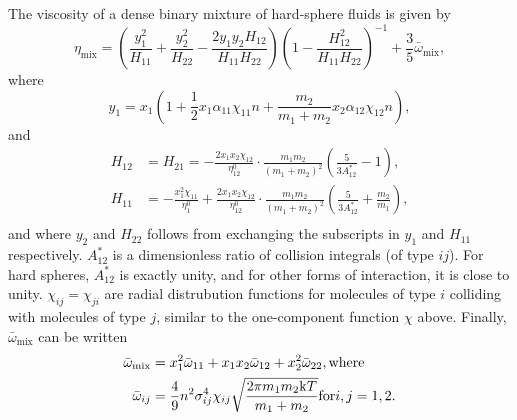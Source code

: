 The viscosity of a dense binary mixture of hard-sphere fluids is given by
\begin{equation}
    \eta_{\text{mix}} 
        = \left(
            \frac{y_1^2}{H_{11}} + \frac{y_2^2}{H_{22}} - \frac{2 y_1 y_2 H_{12}}{H_{11} H_{22}}
        \right)
        \left(
            1 - \frac{H_{12}^2}{H_{11} H_{22}}
        \right)^{-1}
        + \frac{3}{5} \bar{\omega}_{\text{mix}},
\end{equation}
where
\begin{equation}
    \label{eq:viscosity_binary}
    y_1 
        = x_1 \left(
            1 + \frac{1}{2} x_1 \alpha_{11} \chi_{11} n + \frac{m_2}{m_1 + m_2} x_2 \alpha_{12} \chi_{12} n
        \right), 
\end{equation}
and
\begin{equation}
    \begin{split}
        H_{12} &= H_{21}
                =   -\frac{2 x_1 x_2 \chi_{12}}{\eta^0_{12}}
                    \cdot \frac{m_1 m_2}{(m_1 + m_2)^2}
                    \left( \frac{5}{3A^*_{12}} - 1 \right), \\
        H_{11}
                &=  -\frac{x_1^2 \chi_{11}}{\eta^0_1}
                    +\frac{2 x_1 x_2 \chi_{12}}{\eta^0_{12}}
                    \cdot \frac{m_1 m_2}{(m_1 + m_2)^2}
                    \left( \frac{5}{3A^*_{12}} + \frac{m_2}{m_1} \right), \\
    \end{split}
\end{equation}
and where $y_2$ and $H_{22}$ follows from exchanging the subscripts in $y_1$ and $H_{11}$ respectively.
$A^*_{12}$ is a dimensionless ratio of collision integrals (of type ${ij}$).
For hard spheres, $A^*_{12}$ is exactly unity, and for other forms of interaction, it is close to unity.
$\chi_{ij} = \chi_{ji}$ are radial distrubution functions for molecules of type $i$ colliding with molecules of type $j$, similar to the one-component function $\chi$ above.
Finally, $\bar{\omega}_{\text{mix}}$ can be written
\begin{equation}
    \begin{split}
        \bar{\omega}_{\text{mix}} 
            &= x_1^2 \bar{\omega}_{11} + x_1 x_2 \bar{\omega}_{12} + x_2^2 \bar{\omega}_{22}, \text{where}\\
        \bar{\omega}_{ij} 
            &= \frac{4}{9} n^2 \sigma_{ij}^4 \chi_{ij} \sqrt{\frac{2\pi m_1 m_2 \mathrm{k} T}{m_1 + m_2}} \text{for} i,j = 1,2.
    \end{split}
\end{equation}

